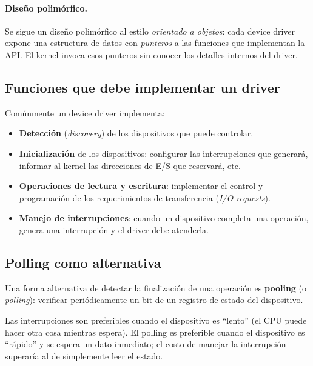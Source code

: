 \documentclass[11pt,a4paper]{article}
\begin{document}
\paragraph{Diseño polimórfico.}
Se sigue un diseño polimórfico al estilo \emph{orientado a objetos}:
cada device driver expone una estructura de datos con \emph{punteros}
a las funciones que implementan la API. El kernel invoca esos punteros
sin conocer los detalles internos del driver.

\subsection{Funciones que debe implementar un driver}

Comúnmente un device driver implementa:

\begin{itemize}[leftmargin=*]
    \item \textbf{Detección} (\emph{discovery}) de los dispositivos que
        puede controlar.
    \item \textbf{Inicialización} de los dispositivos: configurar las
        interrupciones que generará, informar al kernel las direcciones
        de E/S que reservará, etc.
    \item \textbf{Operaciones de lectura y escritura}: implementar el
        control y programación de los requerimientos de transferencia
        (\emph{I/O requests}).
    \item \textbf{Manejo de interrupciones}: cuando un dispositivo
        completa una operación, genera una interrupción y el driver
        debe atenderla.
\end{itemize}

\subsection{Polling como alternativa}

Una forma alternativa de detectar la finalización de una operación es
\textbf{pooling} (o \emph{polling}): verificar periódicamente un bit
de un registro de estado del dispositivo.

\begin{importante}
Las interrupciones son preferibles cuando el dispositivo es ``lento''
(el CPU puede hacer otra cosa mientras espera). El polling es preferible
cuando el dispositivo es ``rápido'' y se espera un dato inmediato; el
costo de manejar la interrupción superaría al de simplemente leer el
estado.
\end{importante}
\end{document}
